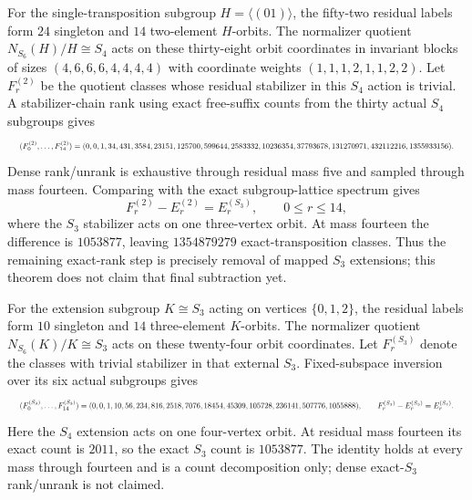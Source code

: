 \documentclass{article}
\newcommand{\fitmath}[1]{\resizebox{0.99\linewidth}{!}{$\displaystyle #1$}}
\begin{document}
For the single-transposition subgroup $H=\langle(01)\rangle$, the fifty-two
residual labels form $24$ singleton and $14$ two-element $H$-orbits. The
normalizer quotient $N_{S_6}(H)/H\cong S_4$ acts on these thirty-eight orbit
coordinates in invariant blocks of sizes
$(4,6,6,6,4,4,4,4)$ with coordinate weights
$(1,1,1,2,1,1,2,2)$. Let $F_r^{(2)}$ be the quotient classes whose residual
stabilizer in this $S_4$ action is trivial. A stabilizer-chain rank using exact
free-suffix counts from the thirty actual $S_4$ subgroups gives
\begin{equation}
  \fitmath{%
    (F_0^{(2)},\ldots,F_{14}^{(2)})=
    (0,0,1,34,431,3584,23151,125700,599644,2583332,10236354,
     37793678,131270971,432112216,1355933156).
  }
  \label{eq:optimization-crazy-sextuple-s6-full-transposition-free-ranking}
\end{equation}
Dense rank/unrank is exhaustive through residual mass five and sampled through
mass fourteen. Comparing with the exact subgroup-lattice spectrum gives
\[
  F_r^{(2)}-E_r^{(2)}=E_r^{(S_3)},\qquad 0\leq r\leq14,
\]
where the $S_3$ stabilizer acts on one three-vertex orbit. At mass fourteen the
difference is $1053877$, leaving $1354879279$ exact-transposition classes.
Thus the remaining exact-rank step is precisely removal of mapped $S_3$
extensions; this theorem does not claim that final subtraction yet.

For the extension subgroup $K\cong S_3$ acting on vertices $\{0,1,2\}$, the
residual labels form $10$ singleton and $14$ three-element $K$-orbits. The
normalizer quotient $N_{S_6}(K)/K\cong S_3$ acts on these twenty-four orbit
coordinates. Let $F_r^{(S_3)}$ denote the classes with trivial stabilizer in
that external $S_3$. Fixed-subspace inversion over its six actual subgroups
gives
\begin{equation}
  \fitmath{%
    (F_0^{(S_3)},\ldots,F_{14}^{(S_3)})=
    (0,0,1,10,56,234,816,2518,7076,18454,45309,105728,236141,
     507776,1055888),
    \qquad
    F_r^{(S_3)}-E_r^{(S_3)}=E_r^{(S_4)}.
  }
  \label{eq:optimization-crazy-sextuple-s6-full-s3-extension-decomposition}
\end{equation}
Here the $S_4$ extension acts on one four-vertex orbit. At residual mass
fourteen its exact count is $2011$, so the exact $S_3$ count is $1053877$.
The identity holds at every mass through fourteen and is a count decomposition
only; dense exact-$S_3$ rank/unrank is not claimed.
\end{document}
